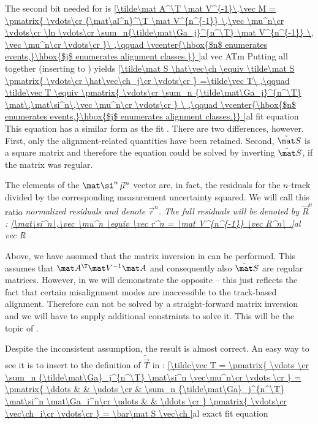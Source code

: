 The second bit needed for  is
\eqref{\tilde\mat A^\T \mat V^{-1}\,\vec M = \pmatrix{
	\vdots\cr
	{\mat\al^n}^\T \mat V^{n^{-1}} \,\vec \mu^n\cr
	\vdots\cr
	\ln
	\vdots\cr
	\sum_n{\tilde\mat\Ga_j}^{n^\T} \mat V^{n^{-1}} \, \vec \mu^n\cr
	\vdots\cr
}\ ,\qquad
\vcenter{\hbox{$n$ enumerates events,}\hbox{$j$ enumerates alignment classes.}}
}{al vec ATm}
Putting all together (inserting  to ) yields
\eqref{\tilde\mat S \hat\vec\ch \equiv
\tilde\mat S \pmatrix{
	\vdots\cr
	\hat\vec\ch_j\cr
	\vdots\cr
}
=\tilde\vec T\ ,\qquad
\tilde\vec T \equiv \pmatrix{
	\vdots\cr
	\sum_n {\tilde\mat\Ga_j}^{n^\T} \mat\,\mat\si^n\,\vec \mu^n\cr
	\vdots\cr
}
\ ,\qquad
\vcenter{\hbox{$n$ enumerates events,}\hbox{$j$ enumerates alignment classes.}}
}{al fit equation}
This equation has a similar form as the  fit . There are two differences, however. First, only the alignment-related quantities have been retained. Second, $\tilde\mat S$ is a square matrix and therefore the equation could be solved by inverting $\tilde\mat S$, if the matrix was regular.

The elements of the $\mat\si^n\,\vec \mu^n$ vector are, in fact, the residuals for the $n$-track divided by the corresponding measurement uncertainty squared. We will call this ratio \em{normalized residuals} and denote $\vec r^n$. The \em{full residuals} will be denoted by $\vec R^n$:
\eqref{\mat\si^n\,\vec \mu^n \equiv \vec r^n = \mat V^{n^{-1}} \vec R^n\ .}{al vec R}

Above, we have assumed that the matrix inversion in  can be performed. This assumes that $\mat A^\T \mat V^{-1} \mat A$ and consequently also $\tilde\mat S$ are regular matrices. However, in  we will demonstrate the opposite -- this just reflects the fact that certain misalignment modes are inaccessible to the track-based alignment. Therefore  can not be solved by a straight-forward matrix inversion and we will have to supply additional constraints to solve it. This will be the topic of .

Despite the inconsistent assumption, the result  is almost correct. An easy way to see it is to insert  to the definition of $\tilde\vec T$ in :
\eqref{\tilde\vec T =
\pmatrix{
	\vdots \cr
	\sum_n {\tilde\mat\Ga}_j^{n^\T} \mat\si^n \vec\mu^n\cr
	\vdots \cr
}
=
\pmatrix{
	\ddots & & \udots \cr
	 & \sum_n {\tilde\mat\Ga}_j^{n^\T} \mat\si^n \mat\Ga_i^n\cr
	\udots & & \ddots \cr
}
\pmatrix{
	\vdots\cr
	\vec\ch_i\cr
	\vdots\cr
}
=
\bar\mat S \vec\ch
}{al exact fit equation}

